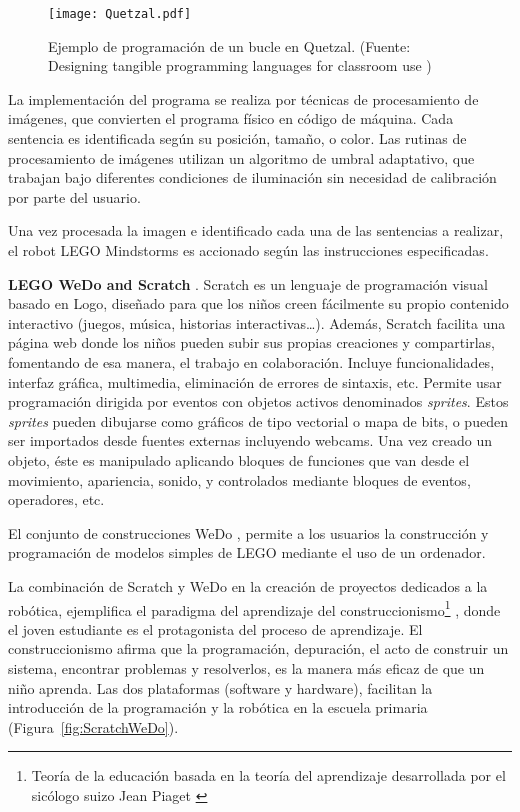 \begin{figure}[!h]
\begin{center}
\texttt{[image: Quetzal.pdf]}
\caption{Ejemplo de programación de un bucle en Quetzal. (Fuente: Designing tangible programming languages for classroom use \cite{Quetzal})}
\label{fig:Quetzal}
\end{center}
\end{figure}

La implementación del programa se realiza por técnicas de procesamiento de imágenes, que convierten el programa físico en código de máquina. Cada sentencia es identificada según su posición, tamaño, o color. Las rutinas de procesamiento de imágenes utilizan un algoritmo de umbral adaptativo, que trabajan bajo diferentes condiciones de iluminación sin necesidad de calibración por parte del usuario. 

Una vez procesada la imagen e identificado cada una de las sentencias a realizar, el robot LEGO Mindstorms es accionado según las instrucciones especificadas.

\textbf{LEGO WeDo and Scratch} \cite{ScratchWeDo}. Scratch \cite{Scratch} es un lenguaje de programación visual basado en Logo, diseñado para que los niños creen fácilmente su propio contenido interactivo (juegos, música, historias interactivas…). Además, Scratch facilita una página web donde los niños pueden subir sus propias creaciones y compartirlas, fomentando de esa manera, el trabajo en colaboración. Incluye funcionalidades, interfaz gráfica, multimedia, eliminación de errores de sintaxis, etc. Permite usar programación dirigida por eventos con objetos activos denominados \emph{sprites}. Estos \emph{sprites} pueden dibujarse como gráficos de tipo vectorial o mapa de bits, o pueden ser importados desde fuentes externas incluyendo webcams. Una vez creado un objeto, éste es manipulado aplicando bloques de funciones que van desde el movimiento, apariencia, sonido, y controlados mediante bloques de eventos, operadores, etc.

El conjunto de construcciones WeDo \cite{WeDo}, permite a los usuarios la construcción y programación de modelos simples de LEGO mediante el uso de un ordenador.

La combinación de Scratch y WeDo en la creación de proyectos dedicados a la robótica, ejemplifica el paradigma del aprendizaje del construccionismo\footnote{Teoría de la educación basada en la teoría del aprendizaje desarrollada por el sicólogo suizo Jean Piaget \cite{Piaget}} \cite{Papert}, donde el joven estudiante es el protagonista del proceso de aprendizaje. El construccionismo afirma que la programación, depuración, el acto de construir un sistema, encontrar problemas y resolverlos, es la manera más eficaz de que un niño aprenda. Las dos plataformas (software y hardware), facilitan la introducción de la programación y la robótica en la escuela primaria (Figura~\ref{fig:ScratchWeDo}).

